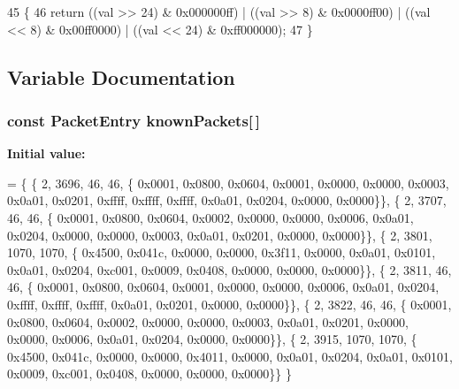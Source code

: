 \begin{DoxyCode}
45 \{
46   \textcolor{keywordflow}{return} ((val >> 24) & 0x000000ff) | ((val >> 8) & 0x0000ff00) | ((val << 8) & 0x00ff0000) | ((val << 24) 
      & 0xff000000);
47 \}
\end{DoxyCode}


\subsection{Variable Documentation}
\subsubsection[{\texorpdfstring{known\+Packets}{knownPackets}}]{\setlength{\rightskip}{0pt plus 5cm}const {\bf Packet\+Entry} known\+Packets\mbox{[}$\,$\mbox{]}\hspace{0.3cm}{\ttfamily [static]}}\hypertarget{pcap-file-test-suite_8cc_acfb9111e8cf0f99feb122526fba2c98d}{}\label{pcap-file-test-suite_8cc_acfb9111e8cf0f99feb122526fba2c98d}
{\bfseries Initial value\+:}
\begin{DoxyCode}
= \{
  \{ 2, 3696,   46,   46, \{ 0x0001, 0x0800, 0x0604, 0x0001, 0x0000, 0x0000, 0x0003, 0x0a01,
                           0x0201, 0xffff, 0xffff, 0xffff, 0x0a01, 0x0204, 0x0000, 0x0000\}\},
  \{ 2, 3707,   46,   46, \{ 0x0001, 0x0800, 0x0604, 0x0002, 0x0000, 0x0000, 0x0006, 0x0a01,
                           0x0204, 0x0000, 0x0000, 0x0003, 0x0a01, 0x0201, 0x0000, 0x0000\}\},
  \{ 2, 3801, 1070, 1070, \{ 0x4500, 0x041c, 0x0000, 0x0000, 0x3f11, 0x0000, 0x0a01, 0x0101,
                           0x0a01, 0x0204, 0xc001, 0x0009, 0x0408, 0x0000, 0x0000, 0x0000\}\},
  \{ 2, 3811,   46,   46, \{ 0x0001, 0x0800, 0x0604, 0x0001, 0x0000, 0x0000, 0x0006, 0x0a01,
                           0x0204, 0xffff, 0xffff, 0xffff, 0x0a01, 0x0201, 0x0000, 0x0000\}\},
  \{ 2, 3822,   46,   46, \{ 0x0001, 0x0800, 0x0604, 0x0002, 0x0000, 0x0000, 0x0003, 0x0a01,
                           0x0201, 0x0000, 0x0000, 0x0006, 0x0a01, 0x0204, 0x0000, 0x0000\}\},
  \{ 2, 3915, 1070, 1070, \{ 0x4500, 0x041c, 0x0000, 0x0000, 0x4011, 0x0000, 0x0a01, 0x0204,
                           0x0a01, 0x0101, 0x0009, 0xc001, 0x0408, 0x0000, 0x0000, 0x0000\}\}
\}
\end{DoxyCode}
